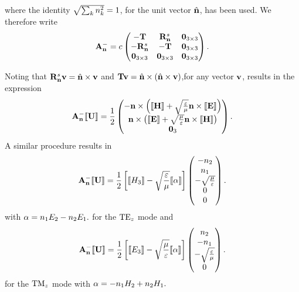 where the identity $\sqrt{\sum_{k} n_{k}^2} = 1$, for the unit vector $\hat{\mathbf{n}}$, has been used. We therefore write
\begin{align*}
\mathbf{A}_\mathbf{n}^{-} = c
\begin{pmatrix}
  -\mathbf{T} & \mathbf{R}^{s}_{\mathbf{n}} & \mathbf{0}_{3\times3} \\
  -\mathbf{R}^{s}_{\mathbf{n}}  & -\mathbf{T} & \mathbf{0}_{3\times3} \\
   \mathbf{0}_{3\times3} & \mathbf{0}_{3\times3} & \mathbf{0}_{3\times3} 
\end{pmatrix} .
\end{align*}

Noting that $\mathbf{R}^{s}_{\mathbf{n}} \mathbf{v} = \hat{\mathbf{n}} \times \mathbf{v}$ and $\mathbf{T} \mathbf{v} = \hat{\mathbf{n}} \times \left(  \hat{\mathbf{n}}
  \times \mathbf{v} \right)$,for any vector $\mathbf{v}$, results in the expression
\begin{align}
\mathbf{A}_\mathbf{n}^{-} \llbracket \mathbf{U} \rrbracket = \frac{1}{2}
\begin{pmatrix}
  -\mathbf{n} \times \left( \llbracket \mathbf{H} \rrbracket + \sqrt{\frac{\varepsilon}{\mu}} \mathbf{n} \times \llbracket \mathbf{E} \rrbracket \right) \\
   \mathbf{n} \times \left( \llbracket \mathbf{E} \rrbracket + \sqrt{\frac{\mu}{\varepsilon}} \mathbf{n} \times \llbracket \mathbf{H} \rrbracket \right) \\
  \mathbf{0}_3
\end{pmatrix} .
  \label{eq:AnMinuU-expression-3D}
\end{align}
A similar procedure results in
\begin{align*}
\mathbf{A}_\mathbf{n}^{-} \llbracket \mathbf{U} \rrbracket =
  \frac{1}{2}
  \left[
    \llbracket H_3 \rrbracket - \sqrt{\frac{\varepsilon}{\mu}} \llbracket \alpha \rrbracket
  \right]
\begin{pmatrix}
   -n_2 \\
   n_1 \\
   - \sqrt{ \frac{\mu}{\varepsilon} } \\
   0  \\
   0 
\end{pmatrix} .
  \label{eq:AnMinuU-expression-TE}
\end{align*}
with $ \alpha = n_1 E_2 - n_2 E_1. $
for the $\textrm{TE}_{z}$ mode and
\begin{align*}
\mathbf{A}_\mathbf{n}^{-} \llbracket \mathbf{U} \rrbracket =
  \frac{1}{2}
  \left[
    \llbracket E_3 \rrbracket - \sqrt{\frac{\mu}{\varepsilon}} \llbracket \alpha \rrbracket
  \right]
\begin{pmatrix}
   n_2 \\
   -n_1 \\
   -\sqrt{ \frac{\varepsilon}{\mu} } \\
   0 
\end{pmatrix} .
  \label{eq:AnMinuU-expression-TM}
\end{align*}
for the $\textrm{TM}_{z}$ mode with $ \alpha = - n_1 H_2 + n_2 H_1. $

